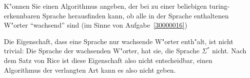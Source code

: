 K"onnen Sie einen Algorithmus angeben, der bei zu einer beliebigen
turing-erkennbaren
Sprache herausfinden kann, ob alle in der Sprache enthaltenen W"orter
``wachsend'' sind (im Sinne von Aufgabe~\ref{30000016})

\begin{loesung}
Die Eigenschaft, dass eine Sprache nur wachsende W"orter
enth"alt, ist nicht trivial: Die Sprache der wachsenden
W"orter, hat sie, die Sprache $\Sigma^*$ nicht. Nach dem
Satz von Rice ist diese Eigenschaft also nicht entscheidbar,
einen Algorithmus der verlangten Art kann es also nicht geben.
\end{loesung}
